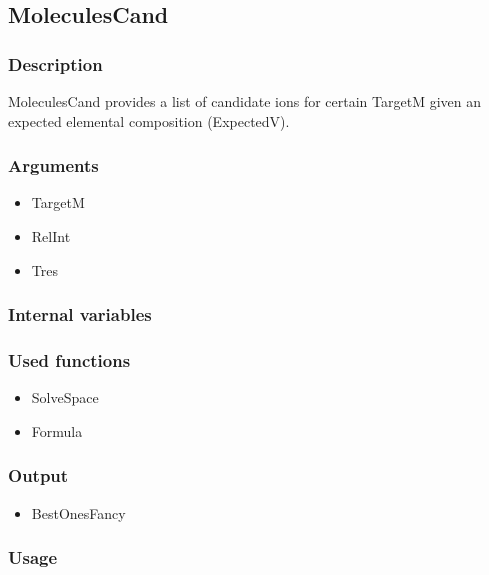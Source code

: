 \subsection{MoleculesCand}
\subsubsection{Description}
MoleculesCand provides a list of candidate ions for certain TargetM given an expected elemental composition (ExpectedV).
\subsubsection{Arguments}
\begin{itemize}
\item TargetM
\item RelInt
\item Tres
\end{itemize}
\subsubsection{Internal variables}
\subsubsection{Used functions}
\begin{itemize}
\item SolveSpace
\item Formula
\end{itemize}
\subsubsection{Output}
\begin{itemize}
\item BestOnesFancy %
\end{itemize}
\subsubsection{Usage}

